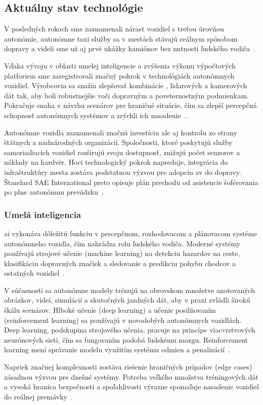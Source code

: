 \subsection{Aktuálny stav technológie}
V posledných rokoch sme zaznamenali nárast vozidiel s treťou úrovňou autonómie, autonómne taxi služby sa v mestách stávajú reálnym spôsobom dopravy a videli sme už aj prvé ukážky kamiónov bez nutnosti ľudského vodiča~\cite{electronics2022}\cite{mckinsey2026}.\par
Vďaka vývoju v oblasti umelej inteligencie a zvýšenia výkonu výpočtových platforiem sme zaregistrovali značný pokrok v technológiách autonómnych vozidiel. Výrobcovia sa snažia zlepšovať kombinácie , \acrshort{lidar}ových a kamerových dát tak, aby boli robustnejšie voči dopravným a poveternostným podmienkam. Pokračuje snaha v návrhu scenárov pre hraničné situácie, čím sa zlepší percepčná schopnosť autonómnych systémov a zrýchli ich nasadenie~\cite{motortrend2026}\cite{nvidia2026}.\par
Autonómne vozidla zaznamenali značnú investíciu ale aj kontrolu zo strany štátnych a nadnárodných organizácií. Spoločnosti, ktoré poskytujú služby samoriadiacich vozidiel rozširujú svoju dostupnosť, znižujú počet senzorov a náklady na hardvér. Hoci technologický pokrok napreduje, integrácia do infraštruktúry mesta zostáva podstatnou výzvou pre adopciu \acrshort{av} do dopravy. Štandard SAE International preto opisuje plán prechodu od asistencie šoférovania po plne autonómnu prevádzku~\cite{theguardian2026}\cite{waymo2026}.
\subsubsection{Umelá inteligencia}
\acrfull{ai} vykonáva dôležitú funkciu v percepčnom, rozhodovacom a plánovacom systéme autonómneho vozidla, čím nahrádza rolu ľudského vodiča. Moderné systémy používajú strojové učenie (machine learning) na detekciu hazardov na ceste, klasifikáciu dopravných značiek a sledovanie a predikciu pohybu chodcov a ostatných vozidiel~\cite{hamza2023}.\par
V súčasnosti sa autonómne modely trénujú na obrovskom množstve anotovaných obrázkov, videí, simulácií a skutočných jazdných dát, aby v praxi zvládli širokú škálu scenárov. Hlboké učenie (deep learning) a učenie posilňovaním (reinforcement learning) sa používajú v novodobých autonómnych vozidlách. Deep learning, podskupina strojového učenia, pracuje na princípe viacvrstvových neurónových sietí, čím sa fungovaním podobá ľudskému mozgu. Reinforcement learning mení správanie modelu využitím systému odmien a penalizácií~\cite{grigorescu2019}.\par
Napriek značnej komplexnosti zostáva riešenie hraničných prípadov (edge cases) zásadnou výzvou pre dnešné systémy. Potreba veľkého množstva tréningových dát a vysoká hranica bezpečnosti a spoľahlivosti výrazne spomaľuje nasadenie vozidiel do reálnej premávky~\cite{nvidia2026}.
